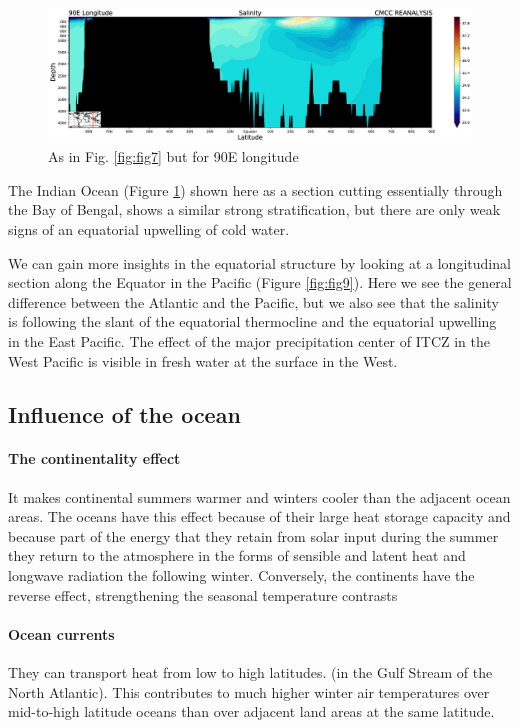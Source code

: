 \begin{figure}[htpb!]
	\centering
	\includegraphics[width = 0.4 \textwidth]{uploads/33image.png}
	\caption{As in Fig. \ref{fig:fig7} but for 90E longitude}
	\label{fig: fig8}
\end{figure}

The Indian Ocean (Figure \ref{fig: fig8}) shown here as a section
cutting essentially through the Bay of Bengal, shows a similar strong
stratification, but there are only weak signs of an equatorial upwelling
of cold water.



We can gain more insights in the equatorial structure by looking at a
longitudinal section along the Equator in the Pacific (Figure \ref{fig:fig9}). Here we see the general difference between the
Atlantic and the Pacific, but we also see that the salinity is following
the slant of the equatorial thermocline and the equatorial upwelling in
the East Pacific. The effect of the major precipitation center of ITCZ
in the West Pacific is visible in fresh water at the surface in the
West.

\subsection{Influence of the ocean}

\paragraph{The continentality effect}
It makes continental summers warmer and winters cooler than the adjacent ocean areas. The oceans have this effect because of their large heat storage capacity and because part of  the energy that they retain from solar input during the summer they return to the atmosphere in the forms of sensible and latent heat and longwave radiation the following winter. Conversely, the continents have the reverse effect, strengthening the seasonal temperature contrasts

\paragraph{Ocean currents}
They can transport heat from low to high latitudes. (in the Gulf Stream of the North Atlantic). This contributes to much higher winter air temperatures over mid-to-high latitude oceans than over adjacent land areas at the same latitude.

